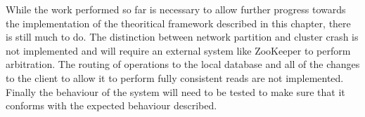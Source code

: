 While the work performed so far is necessary to allow further progress towards the implementation of the theoritical framework described in this chapter, there is still much to do.
The distinction between network partition and cluster crash is not implemented and will require an external system like ZooKeeper to perform arbitration.
The routing of operations to the local database and all of the changes to the client to allow it to perform fully consistent reads are not implemented.
Finally the behaviour of the system will need to be tested to make sure that it conforms with the expected behaviour described.
